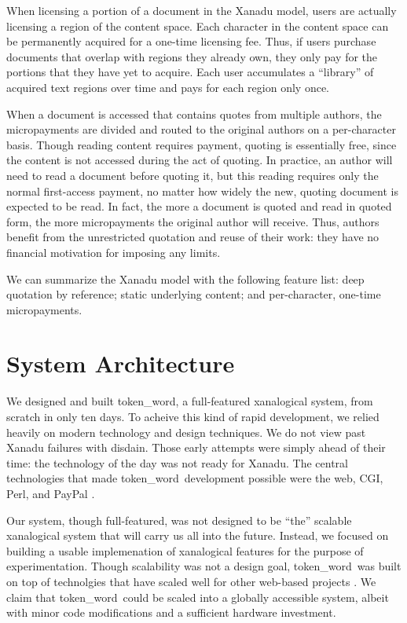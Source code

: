 \documentclass{acm_proc_article-sp}
\newcommand{\tw}{token\_word}
\begin{document}
When licensing a portion of a document in the Xanadu model, users are actually licensing a region of the content space.
Each character in the content space can be permanently acquired for a one-time licensing fee.
Thus, if users purchase documents that overlap with regions they already own, they only pay for the portions that they have yet to acquire.
Each user accumulates a ``library'' of acquired text regions over time and pays for each region only once.

When a document is accessed that contains quotes from multiple authors, the micropayments are divided and routed to the original authors on a per-character basis. 
Though reading content requires payment, quoting is essentially free, since the content is not accessed during the act of quoting.
In practice, an author will need to read a document before quoting it, but this reading requires only the normal first-access payment, no matter how widely the new, quoting document is expected to be read.
In fact, the more a document is quoted and read in quoted form, the more micropayments the original author will receive.
Thus, authors benefit from the unrestricted quotation and reuse of their work:  they have no financial motivation for imposing any limits.

We can summarize the Xanadu model with the following feature list:  deep quotation by reference; static underlying content; and per-character, one-time micropayments.


\section{System Architecture}
We designed and built \tw, a full-featured xanalogical system, from scratch in only ten days.
To acheive this kind of rapid development, we relied heavily on modern technology and design techniques.
We do not view past Xanadu failures with disdain.
Those early attempts were simply ahead of their time:  the technology of the day was not ready for Xanadu.
The central technologies that made \tw \  development possible were the web, CGI, Perl, and PayPal \cite{paypal}.

Our system, though full-featured, was not designed to be ``the'' scalable xanalogical system that will carry us all into the future.
Instead, we focused on building a usable implemenation of xanalogical features for the purpose of experimentation.
Though scalability was not a design goal, \tw \ was built on top of technolgies that have scaled well for other web-based projects \cite{Everything2, WikiWikiWeb, Wikipedia}.
We claim that \tw \  could be scaled into a globally accessible system, albeit with minor code modifications and a sufficient hardware investment. 
\end{document}
